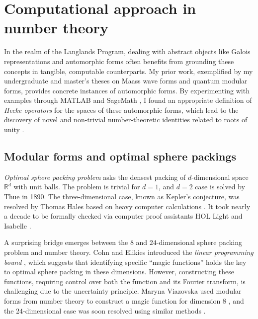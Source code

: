 \documentclass[12pt]{article}
\begin{document}
\section*{Computational approach in number theory}



In the realm of the Langlands Program, dealing with abstract objects like Galois representations and automorphic forms often benefits from grounding these concepts in tangible, computable counterparts.
My prior work, exemplified by my undergraduate and master's theses on Maass wave forms and quantum modular forms, provides concrete instances of automorphic forms.
By experimenting with examples through MATLAB \cite{MATLAB} and SageMath \cite{sagemath}, I found an appropriate definition of \emph{Hecke operators} for the spaces of these automorphic forms, which lead to the discovery of novel and non-trivial number-theoretic identities related to roots of unity \cite{lee2018quantum,lee2019maass}.



\subsection*{Modular forms and optimal sphere packings}

\emph{Optimal sphere packing problem} asks the densest packing of $d$-dimensional space $\mathbb{R}^{d}$ with unit balls.
The problem is trivial for $d = 1$, and $d = 2$ case is solved by Thue in 1890.
The three-dimensional case, known as Kepler's conjecture, was resolved by Thomas Hales based on heavy computer calculations \cite{hales2005proof}.
It took nearly a decade to be formally checked via computer proof assistants HOL Light and Isabelle \cite{hales2017formal}.


A surprising bridge emerges between the $8$ and $24$-dimensional sphere packing problem and number theory. 
Cohn and Elikies introduced the \emph{linear programming bound}  \cite{cohn2003new}, which suggests that identifying specific ``magic functions'' holds the key to optimal sphere packing in these dimensions. 
However, constructing these functions, requiring control over both the function and its Fourier transform, is challenging due to the uncertainty principle.
Maryna Viazovska used modular forms from number theory to construct a magic function for dimension $8$ \cite{viazovska2017sphere}, and the $24$-dimensional case was soon resolved using similar methods \cite{cohn2017sphere}.
\end{document}
